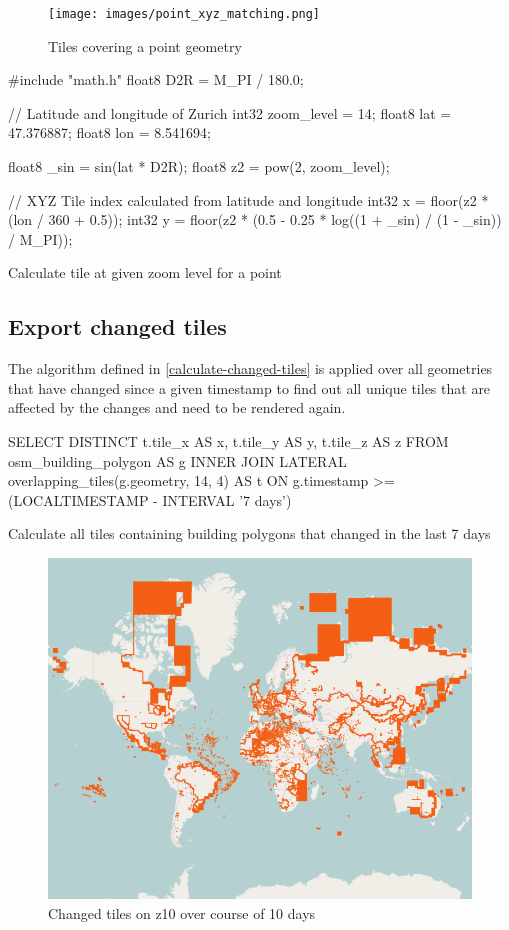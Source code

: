 \begin{figure}[H]
  \centering
  \texttt{[image: images/point\_xyz\_matching.png]}
  \caption{Tiles covering a point geometry}
\end{figure}


\begin{listing}[H]
  \centering
  \begin{ccode}
#include "math.h"
float8 D2R = M_PI / 180.0;

// Latitude and longitude of Zurich
int32 zoom_level = 14;
float8 lat = 47.376887;
float8 lon = 8.541694;

float8 _sin = sin(lat * D2R);
float8 z2 = pow(2, zoom_level);

// XYZ Tile index calculated from latitude and longitude
int32 x = floor(z2 * (lon / 360 + 0.5));
int32 y = floor(z2 * (0.5 - 0.25 * log((1 + _sin) / (1 - _sin)) / M_PI));

  \end{ccode}
  \caption{Calculate tile at given zoom level for a point}
\end{listing}

\subsection{Export changed tiles}

The algorithm defined in \autoref{calculate-changed-tiles} is applied over all geometries that have changed since a given timestamp to find out all unique tiles that are affected by the changes and need to be rendered again.

\begin{listing}[H]
  \centering
  \begin{sqlcode}
    SELECT DISTINCT t.tile_x AS x, t.tile_y AS y, t.tile_z AS z
    FROM osm_building_polygon AS g
    INNER JOIN LATERAL overlapping_tiles(g.geometry, 14, 4) AS t
    ON g.timestamp >= (LOCALTIMESTAMP - INTERVAL '7 days')
  \end{sqlcode}
  \caption{Calculate all tiles containing building polygons that changed in the last 7 days}
\end{listing}

\begin{figure}[H]
  \centering
  \includegraphics[width=1\textwidth]{images/changed_tiles_z10.png}
  \caption{Changed tiles on z10 over course of 10 days}
\end{figure}
